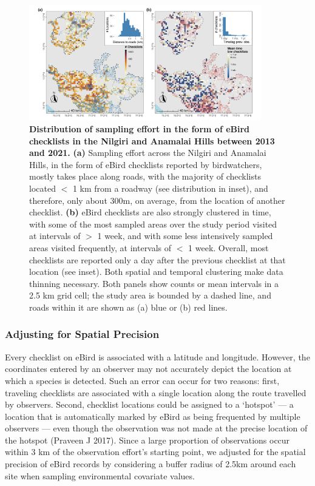 \begin{figure}
    \centering
    \includegraphics[width=0.9\textwidth]{figures/hillybirds/fig_03.png}
    \caption{
        \textbf{Distribution of sampling effort in the form of eBird checklists in the Nilgiri and Anamalai Hills between 2013 and 2021.}
        \textbf{(a)} Sampling effort across the Nilgiri and Anamalai Hills, in the form of eBird checklists reported by birdwatchers, mostly takes place along roads, with the majority of checklists located $<$ 1 km from a roadway (see distribution in inset), and therefore, only about 300m, on average, from the location of another checklist.
        \textbf{(b)} eBird checklists are also strongly clustered in time, with some of the most sampled areas over the study period visited at intervals of $>$ 1 week, and with some less intensively sampled areas visited frequently, at intervals of $<$ 1 week.
        Overall, most checklists are reported only a day after the previous checklist at that location (see inset).
        Both spatial and temporal clustering make data thinning necessary.
        Both panels show counts or mean intervals in a 2.5 km grid cell; the study area is bounded by a dashed line, and roads within it are shown as (a) blue or (b) red lines.
    }
\end{figure}

\subsubsection*{Adjusting for Spatial Precision}

Every checklist on eBird is associated with a latitude and longitude.
However, the coordinates entered by an observer may not accurately depict the location at which a species is detected.
Such an error can occur for two reasons: first, traveling checklists are associated with a single location along the route travelled by observers.
Second, checklist locations could be assigned to a `hotspot' --- a location that is automatically marked by eBird as being frequented by multiple observers --- even though the observation was not made at the precise location of the hotspot (Praveen J 2017).
Since a large proportion of observations occur within 3 km of the observation effort's starting point, we adjusted for the spatial precision of eBird records by considering a buffer radius of 2.5km around each site when sampling environmental covariate values.

